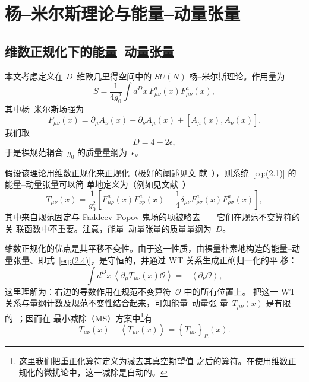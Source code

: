 \section{杨--米尔斯理论与能量--动量张量}
\label{sec:2}
\subsection{维数正规化下的能量--动量张量}
本文考虑定义在 $D$~维欧几里得空间中的 $SU(N)$ 杨--米尔斯理论。作用量为
\begin{equation}
   S=\frac{1}{4g_0^2}\int d^Dx\,F_{\mu\nu}^a(x)F_{\mu\nu}^a(x),
\label{eq:(2.1)}
\end{equation}
其中杨--米尔斯场强为
\begin{equation}
   F_{\mu\nu}(x)
   =\partial_\mu A_\nu(x)-\partial_\nu A_\mu(x)+[A_\mu(x),A_\nu(x)].
\label{eq:(2.2)}
\end{equation}
我们取
\begin{equation}
   D=4-2\epsilon,
\label{eq:(2.3)}
\end{equation}
于是裸规范耦合~$g_0$ 的质量量纲为~$\epsilon$。

假设该理论用维数正规化来正规化（极好的阐述见文
献~\cite{Collins:1984xc}），则系统~\eqref{eq:(2.1)} 的能量--动量张量可以简
单地定义为（例如见文献~\cite{Freedman:1974gs}）
\begin{equation}
   T_{\mu\nu}(x)=\frac{1}{g_0^2}
   \left[F_{\mu\rho}^a(x)F_{\nu\rho}^a(x)
   -\frac{1}{4}\delta_{\mu\nu}F_{\rho\sigma}^a(x)F_{\rho\sigma}^a(x)\right],
\label{eq:(2.4)}
\end{equation}
其中来自规范固定与 Faddeev--Popov 鬼场的项被略去——它们在规范不变算符的关
联函数中不重要。注意，能量--动量张量的质量量纲为~$D$。

维数正规化的优点是其平移不变性。由于这一性质，由裸量朴素地构造的能量--动
量张量、即式~\eqref{eq:(2.4)}，是守恒的，并通过 WT 关系生成正确归一化的平
移：
\begin{equation}
   \int d^Dx\,\left\langle\partial_\mu T_{\mu\nu}(x)\mathcal{O}\right\rangle
   =-\left\langle\partial_\nu\mathcal{O}\right\rangle,
\label{eq:(2.5)}
\end{equation}
这里理解为：右边的导数作用在规范不变算符~$\mathcal{O}$ 中的所有位置上。
把这一 WT 关系与量纲计数及规范不变性结合起来，可知能量--动量张
量~$T_{\mu\nu}(x)$ 是有限的~\cite{Joglekar:1975jm,Nielsen:1977sy}；因而在
最小减除（MS）方案中\footnote{这里我们把重正化算符定义为减去其真空期望值
之后的算符。在使用维数正规化的微扰论中，这一减除是自动的。}有
\begin{equation}
   T_{\mu\nu}(x)-\left\langle T_{\mu\nu}(x)\right\rangle
   =\left\{T_{\mu\nu}\right\}_R(x).
\label{eq:(2.6)}
\end{equation}

